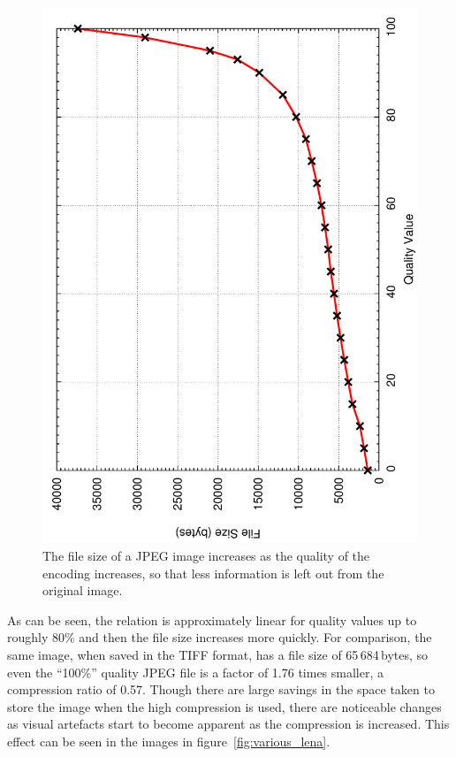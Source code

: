 \begin{figure}[ht]
\begin{minipage}[c]{0.65\linewidth}
				\includegraphics[angle=270,width=\textwidth]{qualityvsfilesize.pdf}
			\end{minipage}
			\caption{The file size of a JPEG image increases as the quality of the encoding increases, so that less information is left out from the original image.\label{fig:percent_vs_size}}
		\end{figure}

		As can be seen, the relation is approximately linear for quality values up to roughly 80\% and then the file size increases more quickly. For comparison, the same image, when saved in the TIFF format, has a file size of 65\,684\,bytes, so even the ``100\%'' quality JPEG file is a factor of 1.76 times smaller, a compression ratio of 0.57. Though there are large savings in the space taken to store the image when the high compression is used, there are noticeable changes as visual artefacts start to become apparent as the compression is increased. This effect can be seen in the images in figure~\ref{fig:various_lena}.


